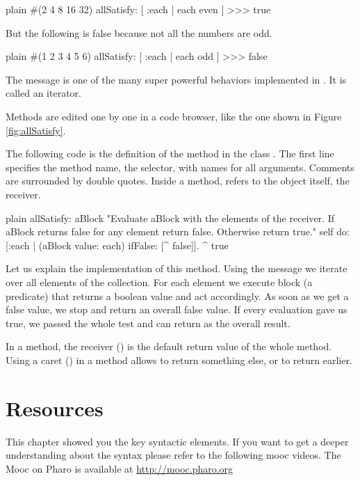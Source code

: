 \documentclass[10pt,twoside,english]{_support/latex/sbabook/sbabook}
\begin{document}
\begin{displaycode}{plain}
#(2 4 8 16 32) allSatisfy: [ :each | each even ]
>>> true
\end{displaycode}

But the following is false because not all the numbers are odd.  

\begin{displaycode}{plain}
#(1 2 3 4 5 6) allSatisfy: [ :each | each odd ]
>>> false
\end{displaycode}

The message  is one of the many super powerful behaviors implemented in . It is called an iterator.

Methods are edited one by one in a code browser, like the one shown in Figure \ref{fig:allSatisfy}.

The following code is the definition of the method  in the class . The first line specifies the method name, the selector, with names for all arguments. Comments are surrounded by double quotes. Inside a method,  refers to the object itself, the receiver.

\begin{displaycode}{plain}
allSatisfy: aBlock
	"Evaluate aBlock with the elements of the receiver.
	If aBlock returns false for any element return false.
	Otherwise return true."
	self do: [:each | (aBlock value: each) ifFalse: [^ false]].
	^ true
\end{displaycode}

Let us explain the implementation of this method. Using the message  we iterate over all elements of the collection. For each element we execute block (a predicate) that returns a boolean value and act accordingly. As soon as we get a false value, we stop and return an overall false value. If every evaluation gave us true, we passed the whole test and can return  as the overall result.

In a method, the receiver () is the default return value of the whole method. Using a caret (\textcode{\string^}) in a method allows to return something else, or to return earlier.
\section{Resources}
This chapter showed you the key syntactic elements. If you want to get a deeper understanding about the syntax please refer to the following mooc videos. The Mooc on Pharo is available at \url{http://mooc.pharo.org}
\end{document}
